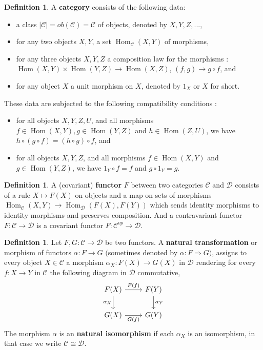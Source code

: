 \documentclass{article}
\theoremstyle{plain}
\theoremstyle{definition}
\newtheorem{definition}[theorem]{Definition}
\DeclareMathOperator{\Hom}{Hom}
\begin{document}
\begin{definition}
    A \textbf{category} consists of the following data:
    \begin{itemize}
        \item[$a)$] a class $|\mathcal{C}|= ob(\mathcal{C}) = \mathcal{C}$ of objects, denoted by $X,Y,Z,...$,
        \item[$b)$] for any two objects $X,Y$, a set $\Hom_{\mathcal{C}}(X,Y)$ of morphisms,
        \item[$c)$] for any three objects $X,Y,Z$ a composition law for the morphisms : \\$\Hom(X,Y) \times \Hom(Y,Z) \rightarrow \Hom(X,Z)$, $(f,g) \rightarrow g\circ f$, and
        \item[$d)$] for any object $X$ a unit morphism on $X$, denoted by $1_X$ or $X$ for short.
    \end{itemize}
   
    These data are subjected to the following compatibility conditions :
    \begin{itemize}
        \item[$1)$] for all objects $X,Y,Z,U$, and all morphisms $f \in \Hom(X,Y), g\in \Hom(Y,Z)$ and $h\in \Hom(Z,U)$, we have $h\circ (g \circ f) = (h\circ g)\circ f$, and
        \item[$2)$] for all objects $X,Y,Z$, and all morphisms $f \in \Hom(X,Y)$ and $g \in \Hom(Y,Z)$, we have $1_Y \circ f= f $ and $g\circ 1_Y= g$.
    \end{itemize}
\end{definition}

\begin{definition}
    A (covariant) \textbf{functor} $F$ between two categories $\mathcal{C}$ and $\mathcal{D}$ consists of a rule $X \mapsto F(X)$ on objects and a map on sets of morphisms $\Hom_{\mathcal{C}}(X, Y)\rightarrow \Hom_{\mathcal{D}}(F(X), F(Y))$ which sends identity morphisms to identity morphisms and preserves composition. And a contravariant functor $F :\mathcal{C}\rightarrow\mathcal{D}$ is a covariant functor $F :\mathcal{C}^{op}\rightarrow\mathcal{D}$.
\end{definition}

\begin{definition}
    Let $F,G : \mathcal{C} \rightarrow\mathcal{D}$ be two functors. A \textbf{natural transformation} or morphism of functors $\alpha : F \rightarrow G$ $($sometimes denoted by $\alpha : F \Rightarrow G)$, assigns to every object $X \in \mathcal{C}$ a morphism $\alpha_X : F(X) \rightarrow G(X)$ in $\mathcal{D}$ rendering for every $f : X \rightarrow Y$ in $\mathcal{C}$ the following diagram in $\mathcal{D}$ commutative,
    \[
    \begin{tikzcd}
        F(X) \arrow[r,"F(f)"] \arrow[d, "\alpha_X"']
        & F(Y) \arrow[d,"\alpha_Y"] \\
        G(X) \arrow[r,"G(f)"']
        &  G(Y)
    \end{tikzcd}
    \]
    The morphism $\alpha$ is an \textbf{natural isomorphism} if each $\alpha_X$ is an isomorphism, in that case we write $\mathcal{C}\cong\mathcal{D}$.
\end{definition}
\end{document}
